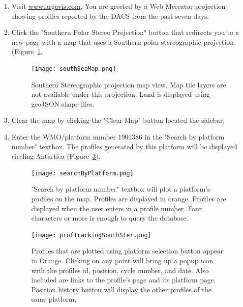 \begin{enumerate}

\item Visit \url{www.argovis.com}. You are greeted by a Web Mercator projection showing profiles reported by the DACS from the past seven days.

\item Click the "Southern Polar Stereo Projection" button that redirects you to a new page with a map that uses a Southern polar stereographic projection (Figure~\ref{fig:south_map}.

\begin{figure}[H]
\begin{minipage}{6in}
\centering
\texttt{[image: southSeaMap.png]}
\caption{\label{fig:south_map} Southern Stereographic projection map view. Map tile layers are not available under this projection. Land is displayed using geoJSON shape files.}
\end{minipage}
\end{figure}

\item Clear the map by clicking the "Clear Map" button located the sidebar.

\item Enter the WMO/platform number 1901386 in the "Search by platform number" textbox. The profiles generated by this platform will be displayed circling Antartica (Figure~\ref{fig:1901386}).

\begin{figure}[H]
\begin{minipage}{6in}
\centering
\texttt{[image: searchByPlatform.png]}
\caption{\label{fig:platform_search} "Search by platform number" textbox will plot a platform's profiles on the map. Profiles are displayed in orange. Profiles are displayed when the user enters in a profile number. Four characters or more is enough to query the database. }
\end{minipage}
\end{figure}

\begin{figure}[H]
\begin{minipage}{6in}
\centering
\texttt{[image: profTrackingSouthSter.png]}
\caption{\label{fig:1901386} Profiles that are plotted using platform selection button appear in Orange. Clicking on any point will bring up a popup icon with the profiles id, position, cycle number, and date. Also included are links to the profile's page and its platform page. Position history button will display the other profiles of the same platform.}
\end{minipage}
\end{figure}


\end{enumerate}
